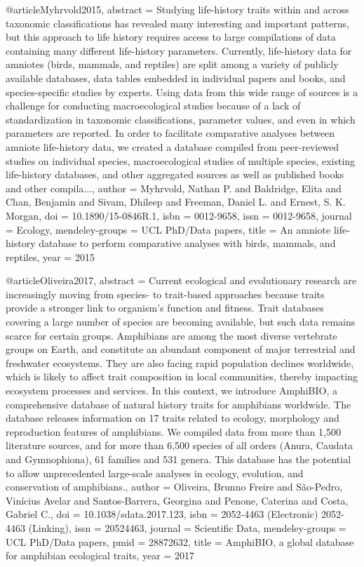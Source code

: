 {{{{@article{Myhrvold2015,
abstract = {Studying life-history traits within and across taxonomic classifications has revealed many interesting and important patterns, but this approach to life history requires access to large compilations of data containing many different life-history parameters. Currently, life-history data for amniotes (birds, mammals, and reptiles) are split among a variety of publicly available databases, data tables embedded in individual papers and books, and species-specific studies by experts. Using data from this wide range of sources is a challenge for conducting macroecological studies because of a lack of standardization in taxonomic classifications, parameter values, and even in which parameters are reported. In order to facilitate comparative analyses between amniote life-history data, we created a database compiled from peer-reviewed studies on individual species, macroecological studies of multiple species, existing life-history databases, and other aggregated sources as well as published books and other compila...},
author = {Myhrvold, Nathan P. and Baldridge, Elita and Chan, Benjamin and Sivam, Dhileep and Freeman, Daniel L. and Ernest, S. K. Morgan},
doi = {10.1890/15-0846R.1},
isbn = {0012-9658},
issn = {0012-9658},
journal = {Ecology},
mendeley-groups = {UCL PhD/Data papers},
title = {{An amniote life-history database to perform comparative analyses with birds, mammals, and reptiles}},
year = {2015}
}

@article{Oliveira2017,
abstract = {Current ecological and evolutionary research are increasingly moving from species- to trait-based approaches because traits provide a stronger link to organism's function and fitness. Trait databases covering a large number of species are becoming available, but such data remains scarce for certain groups. Amphibians are among the most diverse vertebrate groups on Earth, and constitute an abundant component of major terrestrial and freshwater ecosystems. They are also facing rapid population declines worldwide, which is likely to affect trait composition in local communities, thereby impacting ecosystem processes and services. In this context, we introduce AmphiBIO, a comprehensive database of natural history traits for amphibians worldwide. The database releases information on 17 traits related to ecology, morphology and reproduction features of amphibians. We compiled data from more than 1,500 literature sources, and for more than 6,500 species of all orders (Anura, Caudata and Gymnophiona), 61 families and 531 genera. This database has the potential to allow unprecedented large-scale analyses in ecology, evolution, and conservation of amphibians.},
author = {Oliveira, Brunno Freire and S{\~{a}}o-Pedro, Vin{\'{i}}cius Avelar and Santos-Barrera, Georgina and Penone, Caterina and Costa, Gabriel C.},
doi = {10.1038/sdata.2017.123},
isbn = {2052-4463 (Electronic) 2052-4463 (Linking)},
issn = {20524463},
journal = {Scientific Data},
mendeley-groups = {UCL PhD/Data papers},
pmid = {28872632},
title = {{AmphiBIO, a global database for amphibian ecological traits}},
year = {2017}
}

}}}}
